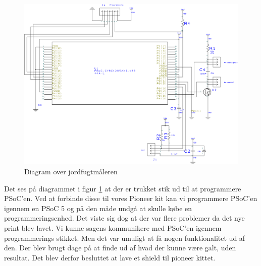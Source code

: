 \begin{figure}[H]
	\centering 
\includegraphics[scale=0.2]{HardwareArkitektur/Sensore/Jordfugt_billeder/Diagram_jordfugt.png}
	\caption{Diagram over jordfugtmåleren}
	\label{photo:Diagram_jordfugt}
\end{figure} 

Det ses på diagrammet i figur \ref{photo:Diagram_jordfugt} at der er trukket stik ud til at programmere PSoC'en. Ved at forbinde disse til vores Pioneer kit kan vi programmere PSoC'en igennem en PSoC 5 og på den måde undgå at skulle købe en programmeringsenhed. Det viste sig dog at der var flere problemer da det nye print blev lavet. Vi kunne sagens kommunikere med PSoC'en igennem programmerings stikket. Men det var umuligt at få nogen funktionalitet ud af den. Der blev brugt dage på at finde ud af hvad der kunne være galt, uden resultat. Det blev derfor besluttet at lave et shield til pioneer kittet. 

